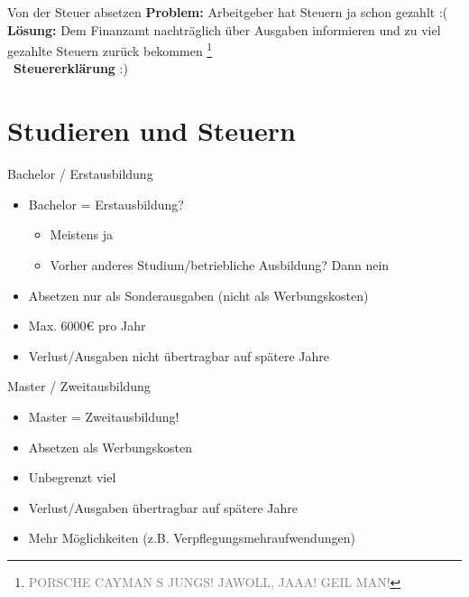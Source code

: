 \documentclass{beamer}
\newcommand{\n}{\hfill\\\vspace{0.25cm}}
\let\oldfootnote\footnote
\renewcommand{\footnote}[1]
{%
	\oldfootnote
	{
		\tiny
		\textcolor{gray}{#1}
	}%
}
\begin{document}
			\begin{frame}{Von der Steuer absetzen}
				\textbf{Problem:} Arbeitgeber hat Steuern ja schon gezahlt :(\n
				\textbf{Lösung:} Dem Finanzamt nachträglich über Ausgaben informieren und zu viel gezahlte Steuern zurück bekommen\footnote{PORSCHE CAYMAN S JUNGS! JAWOLL, JAAA! GEIL MAN!}\n
				\textrightarrow\ \textbf{Steuererklärung} :)
			\end{frame}
		
	\section{Studieren und Steuern}
	
		\begin{frame}
		\end{frame}
	
		\begin{frame}{Bachelor / Erstausbildung}
			\begin{itemize}
				\item Bachelor = Erstausbildung?
				\begin{itemize}
					\item Meistens ja
					\item Vorher anderes Studium/betriebliche Ausbildung? Dann nein
				\end{itemize}
				\item Absetzen nur als Sonderausgaben (nicht als Werbungskosten)
				\item Max. 6000€ pro Jahr
				\item Verlust/Ausgaben nicht übertragbar auf spätere Jahre
			\end{itemize}
		\end{frame}
	
		\begin{frame}{Master / Zweitausbildung}
			\begin{itemize}
				\item Master = Zweitausbildung!
				\item Absetzen als Werbungskosten
				\item Unbegrenzt viel
				\item Verlust/Ausgaben übertragbar auf spätere Jahre
				\item Mehr Möglichkeiten (z.B. Verpflegungsmehraufwendungen)
			\end{itemize}
		\end{frame}
	
\end{document}
